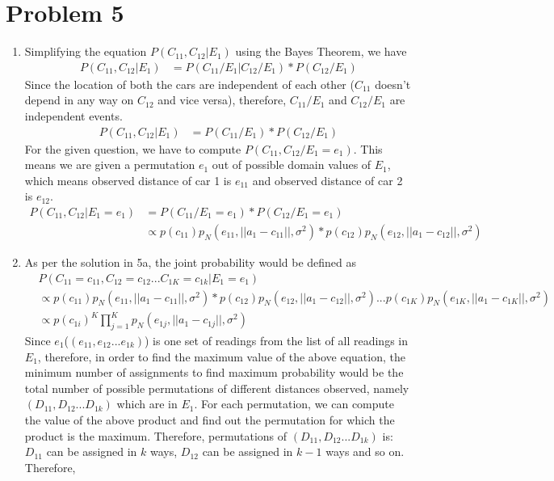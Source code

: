 \documentclass[12pt]{article}
\begin{document}
\section*{Problem 5}

\begin{enumerate}[label=(\alph*)]
  \item Simplifying the equation $P (C_{11}, C_{12} | E_1)$ using the Bayes Theorem, we have
  \begin{align*}
  P (C_{11}, C_{12} | E_1) &= P(C_{11}/E_1| C_{12}/E_1) * P(C_{12}/E_1)
  \end{align*}
  Since the location of both the cars are independent of each other ($C_{11}$ doesn't depend in any way on $C_{12}$ and vice versa), therefore, $C_{11}/E_1$ and $C_{12}/E_1$ are independent events.
  \begin{align*}
  P (C_{11}, C_{12} | E_1) &= P(C_{11}/E_1) * P(C_{12}/E_1)
  \end{align*}
  For the given question, we have to compute $P(C_{11}, C_{12} / E_1 = e_1)$. This means we are given a permutation $e_1$ out of possible domain values of $E_1$, which means observed distance of car 1 is $e_{11}$ and observed distance of car 2 is $e_{12}$.
    \begin{align*}
  P (C_{11}, C_{12} | E_1 = e_1) &= P(C_{11}/E_1 = e_1) * P(C_{12}/E_1 = e_1) \\
  &\propto p(c_{11})p_N (e_{11}, || a_1 - c_{11} ||, \sigma^2) * p(c_{12})p_N (e_{12}, || a_1 - c_{12} ||, \sigma^2)
  \end{align*}
  \item As per the solution in 5a, the joint probability would be defined as
  \begin{align*}
  &P (C_{11} = c_{11}, C_{12} = c_{12} ... C_{1K} = c_{1k} | E_1 = e_1) \\ &\propto p(c_{11})p_N (e_{11}, || a_1 - c_{11} ||, \sigma^2) * p(c_{12})p_N (e_{12}, || a_1 - c_{12} ||, \sigma^2) ... p(c_{1K}) p_N (e_{1K}, || a_1 - c_{1K} ||, \sigma^2) \\
& \propto p(c_{1i})^K \prod_{j=1}^{K} p_N(e_{1j}, || a_1 - c_{1j} ||, \sigma^2)
  \end{align*}
  Since $e_1$($(e_{11}, e_{12} ... e_{1k})$) is one set of readings from the list of all readings in $E_1$, therefore, in order to find the maximum value of the above equation, the minimum number of assignments to find maximum probability would be the total number of possible permutations of different distances observed, namely $(D_{11}, D_{12} ... D_{1k})$ which are in $E_1$. For each permutation, we can compute the value of the above product and find out the permutation for which the product is the maximum. Therefore, permutations of $(D_{11}, D_{12} ... D_{1k})$ is: $D_{11}$ can be assigned in $k$ ways, $D_{12}$ can be assigned in $k-1$ ways and so on. Therefore, 

\end{enumerate}
\end{document}
